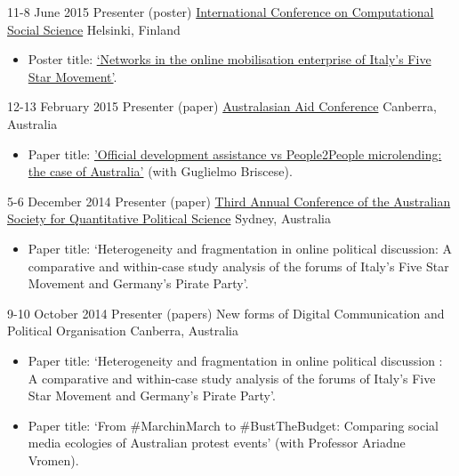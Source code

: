 \documentclass[12pt,a4paper,sans]{moderncv}
\begin{document}
    \cventry
        {11-8 June 2015} %
    {Presenter (poster)} %
    {\href{http://www.iccss2015.eu/}{International Conference on Computational Social Science}} %
    {Helsinki, Finland} %
{}
    {
      \begin{itemize} %
        \item {Poster title:  \href{http://www.francescobailo.net/wordpress/wp-content/uploads/2016/04/f_bailo_poster_iccss15_original.pdf}{`Networks in the online mobilisation enterprise of Italy's Five Star Movement'}.}
      \end{itemize}
    }

    \cventry
        {12-13 February 2015} %
    {Presenter (paper)} %
    {\href{https://devpolicy.crawford.anu.edu.au/annual-australasian-aid-conference/2015}{Australasian Aid Conference}} %
    {Canberra, Australia} %
{}
    {
      \begin{itemize} %
        \item {Paper title:  \href{http://devpolicy.org/2015-Australasian-aid-conference/presentations/2b/Guglielmo-Briscese-and-Francesco-Bailo.pdf}{'Official development assistance vs People2People microlending: the case of Australia'} (with Guglielmo Briscese).} 
      \end{itemize}
    }

    \cventry
        {5-6 December 2014} %
    {Presenter (paper)} %
    {\href{http://www.asqps.org.au/index.php/asqps/2014"}{Third Annual Conference of the Australian Society for Quantitative Political Science}} %
    {Sydney, Australia} %
{}
    {
      \begin{itemize} %
        \item {Paper title: `Heterogeneity and fragmentation in online political discussion: A comparative and within-case study analysis of the forums of Italy's Five Star Movement and Germany's Pirate Party'.}
      \end{itemize}
    }

    \cventry
    {9-10 October 2014} %
    {Presenter (papers)} %
    {New forms of Digital Communication and Political Organisation} %
    {Canberra, Australia} %
    {}
    {
      \begin{itemize} %
        \item {Paper title: `Heterogeneity and fragmentation in online political discussion : A comparative and within-case study analysis of the forums of Italy's Five Star Movement and Germany’s Pirate Party'.}
         \item{Paper title: `From \#MarchinMarch to \#BustTheBudget: Comparing social media ecologies of Australian protest events' (with Professor Ariadne Vromen).}
      \end{itemize}
    }
\end{document}
